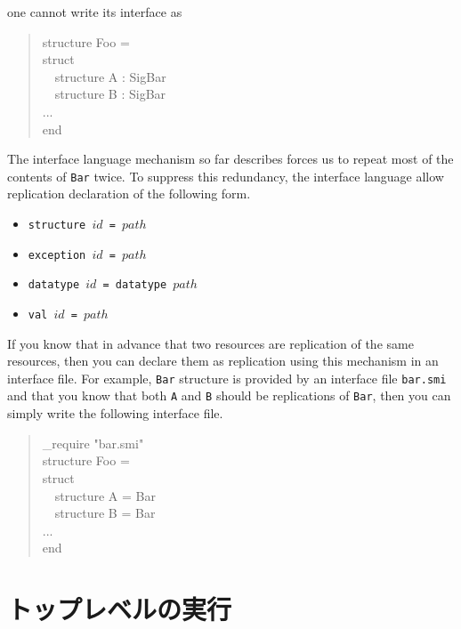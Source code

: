 \documentclass{jbook}
\newcommand{\txt}[2]{#1}
\newcommand{\myem}{\mbox{\ \ }}
\newenvironment{program}{\begin{quote}\begin{tt}}%
                        {\end{tt}\end{quote}}
\begin{document}
one cannot write its interface as
\begin{program}
structure Foo = \\
struct\\
\myem structure A : SigBar\\
\myem structure B : SigBar\\
...\\
end
\end{program}
	The interface language mechanism so far describes forces us to
repeat most of the contents of {\tt Bar} twice.
	To suppress this redundancy, the interface language allow
replication declaration of the following form.
\begin{itemize}
\item {\tt structure $id$ =  $path$}
\item {\tt exception $id$ = $path$}
\item {\tt datatype $id$ = datatype $path$}
\item {\tt val $id$ = $path$}
\end{itemize}
	If you know that in advance that two resources are replication of
the same resources, then you can declare them as replication using this
mechanism in an interface file.
	For example, {\tt Bar} structure is provided by an interface
file {\tt bar.smi} and that you know that both {\tt A} and {\tt B}
should be replications of {\tt Bar}, then you can simply write the
following interface file.
\begin{program}
\_require "bar.smi"\\
structure Foo = \\
struct\\
\myem structure A = Bar\\
\myem structure B = Bar\\
...\\
end
\end{program}
\fi%

\section{\txt{トップレベルの実行}{Top-level execution}}
\end{document}
